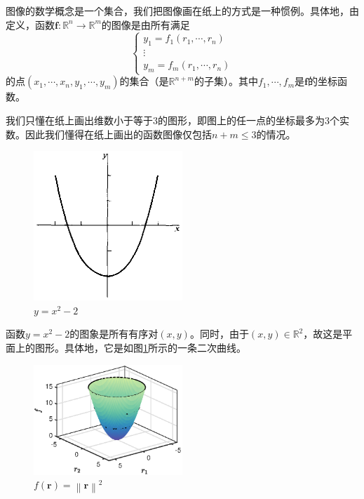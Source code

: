 \documentclass[main.tex]{subfiles}
\begin{document}
图像的数学概念是一个集合，我们把图像画在纸上的方式是一种惯例。具体地，由定义，函数$\mathbf{f}:\mathbb{R}^n\rightarrow\mathbb{R}^m$的图像是由所有满足
\[
\left\{\begin{array}{c}y_1=f_1\left(r_1,\cdots,r_n\right)\\\vdots\\y_m=f_m\left(r_1,\cdots,r_n\right)\end{array}\right.
\]
的点$\left(x_1,\cdots,x_n,y_1,\cdots,y_m\right)$的集合（是$\mathbb{R}^{n+m}$的子集）。其中$f_1,\cdots,f_m$是$\mathbf{f}$的坐标函数。

我们只懂在纸上画出维数小于等于3的图形，即图上的任一点的坐标最多为3个实数。因此我们懂得在纸上画出的函数图像仅包括$n+m\leq3$的情况。

\begin{figure}[h]
    \centering
    \includegraphics[width=0.5\textwidth]{images/II.10.1.eps}
    \caption{$y=x^2-2$}
    \label{fig:II.10.1}
\end{figure}

\begin{example}
函数$y=x^2-2$的图象是所有有序对$\left(x,y\right)$。同时，由于$\left(x,y\right)\in\mathbb{R}^2$，故这是平面上的图形。具体地，它是如图\ref{fig:II.10.1}所示的一条二次曲线。
\end{example}

\begin{figure}[h]
    \centering
    \includegraphics[width=0.5\textwidth]{images/II.10.2.eps}
    \caption{$f\left(\mathbf{r}\right)=\left\|\mathbf{r}\right\|^2$}
    \label{fig:II.10.2}
\end{figure}
\end{document}
